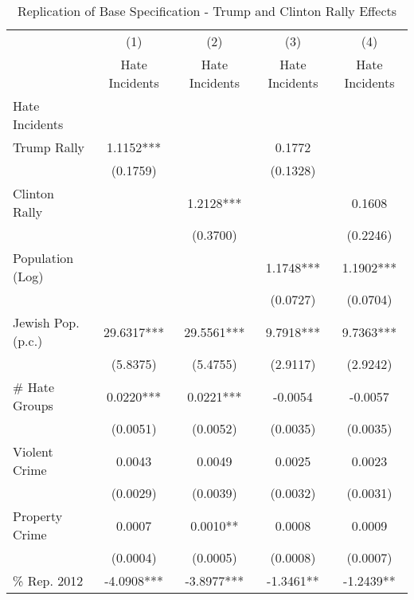 \begin{table}[htbp]\centering
\def\sym#1{\ifmmode^{#1}\else\(^{#1}\)\fi}
\caption{Replication of Base Specification - Trump and Clinton Rally Effects}
\begin{tabular}{l*{4}{c}}
\hline\hline
                    &\multicolumn{1}{c}{(1)}   &\multicolumn{1}{c}{(2)}   &\multicolumn{1}{c}{(3)}   &\multicolumn{1}{c}{(4)}   \\
                    &Hate Incidents   &Hate Incidents   &Hate Incidents   &Hate Incidents   \\
\hline
Hate Incidents      &               &               &               &               \\
Trump Rally         &      1.1152***&               &      0.1772   &               \\
                    &    (0.1759)   &               &    (0.1328)   &               \\
Clinton Rally       &               &      1.2128***&               &      0.1608   \\
                    &               &    (0.3700)   &               &    (0.2246)   \\
Population (Log)    &               &               &      1.1748***&      1.1902***\\
                    &               &               &    (0.0727)   &    (0.0704)   \\
Jewish Pop. (p.c.)  &     29.6317***&     29.5561***&      9.7918***&      9.7363***\\
                    &    (5.8375)   &    (5.4755)   &    (2.9117)   &    (2.9242)   \\
# Hate Groups       &      0.0220***&      0.0221***&     -0.0054   &     -0.0057   \\
                    &    (0.0051)   &    (0.0052)   &    (0.0035)   &    (0.0035)   \\
Violent Crime       &      0.0043   &      0.0049   &      0.0025   &      0.0023   \\
                    &    (0.0029)   &    (0.0039)   &    (0.0032)   &    (0.0031)   \\
Property Crime      &      0.0007   &      0.0010** &      0.0008   &      0.0009   \\
                    &    (0.0004)   &    (0.0005)   &    (0.0008)   &    (0.0007)   \\
\% Rep. 2012        &     -4.0908***&     -3.8977***&     -1.3461** &     -1.2439** \\

\end{tabular}
\end{table}
